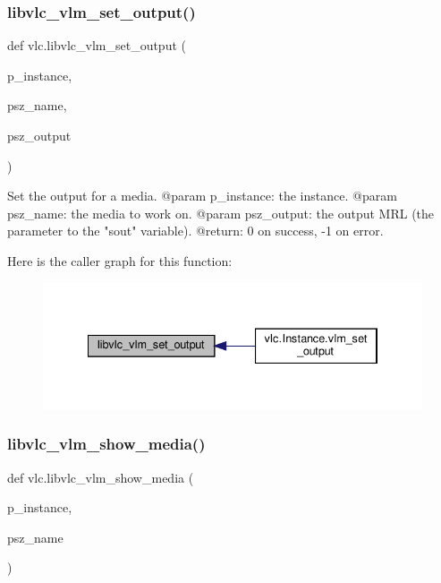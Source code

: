 \subsubsection{\texorpdfstring{libvlc\+\_\+vlm\+\_\+set\+\_\+output()}{libvlc\_vlm\_set\_output()}}
{\footnotesize\ttfamily def vlc.\+libvlc\+\_\+vlm\+\_\+set\+\_\+output (\begin{DoxyParamCaption}\item[{}]{p\+\_\+instance,  }\item[{}]{psz\+\_\+name,  }\item[{}]{psz\+\_\+output }\end{DoxyParamCaption})}

\begin{DoxyVerb}Set the output for a media.
@param p_instance: the instance.
@param psz_name: the media to work on.
@param psz_output: the output MRL (the parameter to the "sout" variable).
@return: 0 on success, -1 on error.
\end{DoxyVerb}
 Here is the caller graph for this function\+:
\nopagebreak
\begin{figure}[H]
\begin{center}
\leavevmode
\includegraphics[width=334pt]{namespacevlc_a2e543e6f50ea55fcf49d57eeb79dc5cc_icgraph}
\end{center}
\end{figure}
\mbox{\label{namespacevlc_a23b89ca7dee175880ded4a71f076bc8a}} 
\subsubsection{\texorpdfstring{libvlc\+\_\+vlm\+\_\+show\+\_\+media()}{libvlc\_vlm\_show\_media()}}
{\footnotesize\ttfamily def vlc.\+libvlc\+\_\+vlm\+\_\+show\+\_\+media (\begin{DoxyParamCaption}\item[{}]{p\+\_\+instance,  }\item[{}]{psz\+\_\+name }\end{DoxyParamCaption})}

